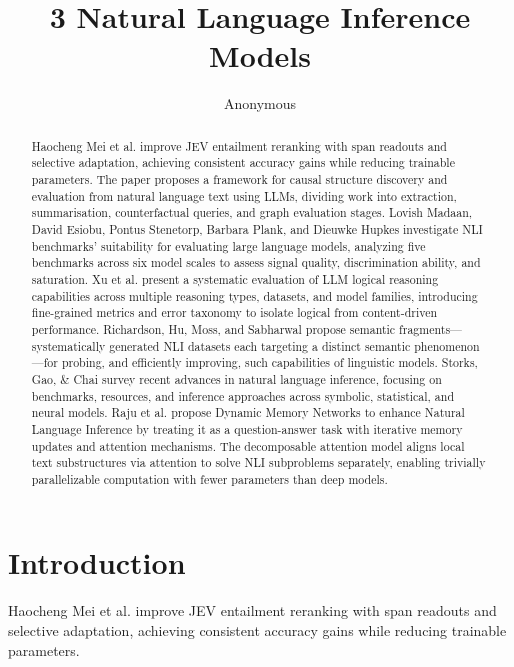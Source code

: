 \documentclass[runningheads]{llncs}
\begin{document}
\title{3   Natural Language Inference Models}
\author{Anonymous}\institute{}
\maketitle
\begin{abstract}
Haocheng Mei et al. improve JEV entailment reranking with span readouts and selective adaptation, achieving consistent accuracy gains while reducing trainable parameters. \cite{mei2026improving} The paper proposes a framework for causal structure discovery and evaluation from natural language text using LLMs, dividing work into extraction, summarisation, counterfactual queries, and graph evaluation stages. \cite{gendron2024counterfactual} Lovish Madaan, David Esiobu, Pontus Stenetorp, Barbara Plank, and Dieuwke Hupkes investigate NLI benchmarks' suitability for evaluating large language models, analyzing five benchmarks across six model scales to assess signal quality, discrimination ability, and saturation. \cite{madaan2024lost} Xu et al. present a systematic evaluation of LLM logical reasoning capabilities across multiple reasoning types, datasets, and model families, introducing fine-grained metrics and error taxonomy to isolate logical from content-driven performance. \cite{xu2023large} Richardson, Hu, Moss, and Sabharwal propose semantic fragments—systematically generated NLI datasets each targeting a distinct semantic phenomenon—for probing, and efficiently improving, such capabilities of linguistic models. \cite{richardson2020probing} Storks, Gao, \& Chai survey recent advances in natural language inference, focusing on benchmarks, resources, and inference approaches across symbolic, statistical, and neural models. \cite{storks2019recent} Raju et al. propose Dynamic Memory Networks to enhance Natural Language Inference by treating it as a question-answer task with iterative memory updates and attention mechanisms. \cite{raju2017dynamic} The decomposable attention model aligns local text substructures via attention to solve NLI subproblems separately, enabling trivially parallelizable computation with fewer parameters than deep models. \cite{parikh2016decomposable}
\end{abstract}
\keywords{}
\section{Introduction}
Haocheng Mei et al. improve JEV entailment reranking with span readouts and selective adaptation, achieving consistent accuracy gains while reducing trainable parameters. \cite{mei2026improving}
\end{document}
